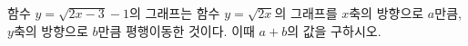 \hspace*{2mm}\begin{minipage}[t]{\dimexpr\linewidth-2mm\relax}\vspace{0pt}
함수 $y=\sqrt{2x-3}-1$의 그래프는 함수 $y=\sqrt{2x}$의 그래프를 $x$축의 방향으로 $a$만큼, $y$축의 방향으로 $b$만큼 평행이동한 것이다. 이때 $a+b$의 값을 구하시오.\end{minipage}
